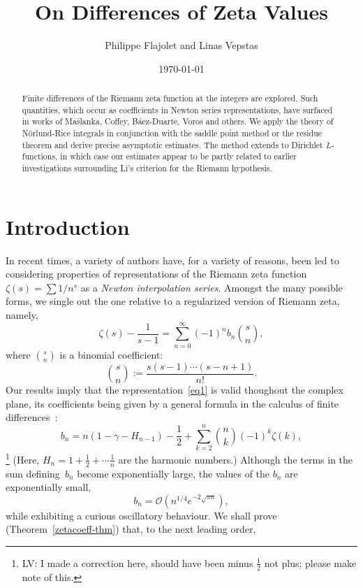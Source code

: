 \documentclass{amsart}
\begin{document}
\date{\today}
\title{On Differences of Zeta Values}
\author{Philippe Flajolet and Linas Vepstas}

\begin{abstract}
Finite differences of the Riemann zeta function at the integers
are explored. Such quantities, which occur as coefficients in Newton series representations, 
have surfaced in works of Ma{\'s}lanka, Coffey, B{\'a}ez-Duarte, Voros and others.
We apply the theory of N\"orlund-Rice integrals in conjunction with
the saddle point method or the residue theorem and derive precise 
asymptotic estimates. The method extends to Dirichlet $L$-functions,
in which case our estimates appear to be partly related to
earlier investigations surrounding Li's criterion for the Riemann hypothesis.
\end{abstract}

\maketitle

\section{Introduction}


 


In recent  times, a variety of  authors have, for a variety  of reasons,
been led  to considering   properties  of  representations of   the
Riemann zeta function $\zeta(s)=\sum 1/n^s$  as a \emph{Newton interpolation
series}.  Amongst the many  possible  forms, we single out
the one relative to a regularized version of Riemann zeta, namely,
\begin{equation}\label{eq1}
\zeta(s)-\frac{1}{s-1}=\sum_{n=0}^\infty
(-1)^n b_n \binom{s}{n},
\end{equation}
where $\binom{s}{n}$ is a binomial coefficient:
\[
\binom{s}{n}:=\frac{s(s-1)\cdots(s-n+1)}{n!}.
\]
Our results imply that the representation~\eqref{eq1} is
valid thoughout the complex plane,
its coefficients being given by a general formula in the calculus of finite
differences~\cite{Jordan65,Milne81,Norlund54}:
\begin{equation}\label{eq2}
b_n=
n(1-\gamma-H_{n-1})-\frac12+\sum_{k=2}^n \binom{n}{k}
(-1)^k\zeta(k),
\end{equation}
\footnote{ LV: I made a correction here, should have been 
minus $\frac12$ not plus; please make note of this.}
(Here,
$H_n=1+\frac12+\cdots\frac1n$ are the harmonic numbers.)
Although the terms in the sum defining~$b_n$ become
exponentially large, the values of the $b_n$ are exponentially small,
\[
b_n=\mathcal{O}\left(n^{1/4}e^{-2\sqrt{\pi n}}\right),
\]
while exhibiting a curious oscillatory behaviour. 
We shall prove (Theorem~\ref{zetacoeff-thm}) that, to the next leading
order,
\end{document}

